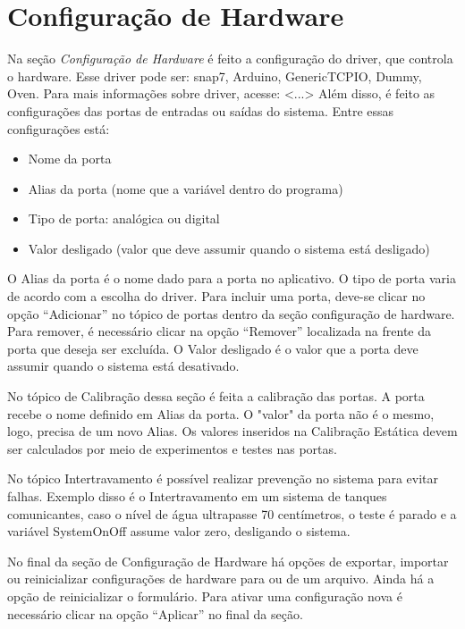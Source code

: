 
\chapter{Configuração de Hardware}%
\label{chapter:hardware-configuration}

Na seção \textit{Configuração de Hardware} é feito a configuração do driver, que
controla o hardware. Esse driver pode ser: snap7, Arduino, GenericTCPIO, Dummy,
Oven. Para mais informações sobre driver, acesse: <...> Além disso, é feito as
configurações das portas de entradas ou saídas do sistema. Entre essas
configurações está:

\begin{itemize}
    \item Nome da porta
    \item Alias da porta (nome que a variável dentro do programa)
    \item Tipo de porta: analógica ou digital
    \item Valor desligado (valor que deve assumir quando o sistema está desligado)
\end{itemize}

O Alias da porta é o nome dado para a porta no aplicativo. O tipo de porta
varia de acordo com a escolha do driver. Para incluir uma porta, deve-se clicar
no opção “Adicionar” no tópico de portas dentro da seção configuração de
hardware. Para remover, é necessário clicar na opção “Remover” localizada na
frente da porta que deseja ser excluída. O Valor desligado é o valor que a
porta deve assumir quando o sistema está desativado.

No tópico de Calibração dessa seção é feita a calibração das portas. A porta
recebe o nome definido em Alias da porta. O "valor" da porta não é o mesmo,
logo, precisa de um novo Alias. Os valores inseridos na Calibração Estática
devem ser calculados por meio de experimentos e testes nas portas.

No tópico Intertravamento é possível realizar prevenção no sistema para evitar
falhas. Exemplo disso é o Intertravamento em um sistema de tanques
comunicantes, caso o nível de água ultrapasse 70 centímetros, o teste é parado
e a variável SystemOnOff assume valor zero, desligando o sistema.
	
No final da seção de Configuração de Hardware há opções de exportar, importar
ou reinicializar configurações de hardware para ou de um arquivo. Ainda há a
opção de reinicializar o formulário. Para ativar uma configuração nova é
necessário clicar na opção “Aplicar” no final da seção.

